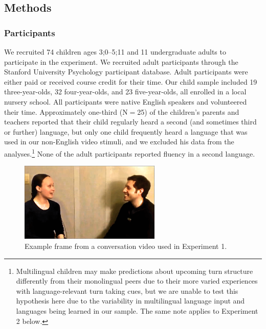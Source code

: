 \documentclass[authoryear, 12pt]{elsarticle}
\begin{document}
\subsection*{Methods}
\label{sec:methods1}

\subsubsection*{Participants}

We recruited 74 children ages 3;0--5;11 and 11 undergraduate adults to participate in the experiment. We recruited adult participants through the Stanford University Psychology participant database. Adult participants were either paid or received course credit for their time. Our child sample included 19 three-year-olds, 32 four-year-olds, and 23 five-year-olds, all enrolled in a local nursery school. All participants were native English speakers and volunteered their time. Approximately one-third (N$=$25) of the children's parents and teachers reported that their child regularly heard a second (and sometimes third or further) language, but only one child frequently heard a language that was used in our non-English video stimuli, and we excluded his data from the analyses.\footnote{Multilingual children may make predictions about upcoming turn structure differently from their monolingual peers due to their more varied experiences with language-relevant turn taking cues, but we are unable to test this hypothesis here due to the variability in multilingual language input and languages being learned in our sample. The same note applies to Experiment 2 below.} None of the adult participants reported fluency in a second language.

\begin{figure}[t]
\begin{center}
\includegraphics[width=0.6\textwidth]{figures/FIG-FL-stim.png}
\end{center}
\caption{Example frame from a conversation video used in Experiment 1.} 
\label{fig:speakers}
\end{figure}
\end{document}

